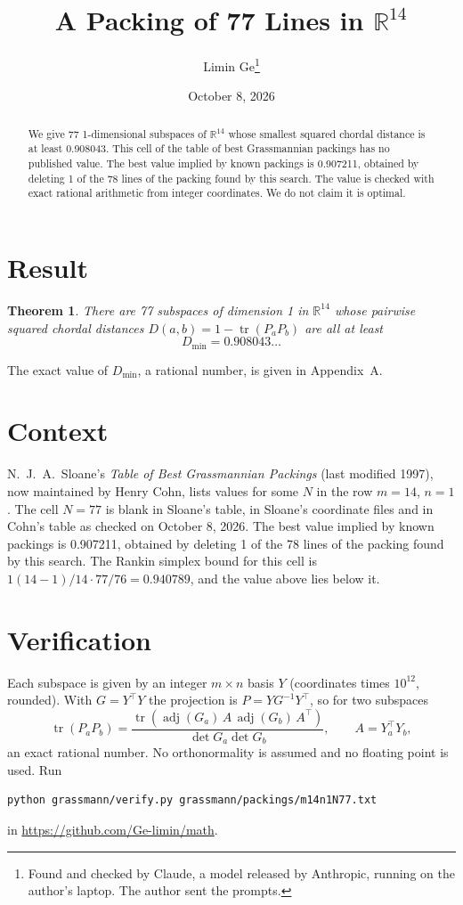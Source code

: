 \documentclass[11pt,a4paper]{article}
\title{A Packing of 77 Lines in $\mathbb{R}^{14}$}
\author{Limin Ge\thanks{Found and checked by Claude, a model released by Anthropic, running on the author's laptop. The author sent the prompts.}}
\date{October 8, 2026}
\newtheorem*{theorem}{Theorem}
\begin{document}
\maketitle
\begin{abstract}
We give 77 1-dimensional subspaces of $\mathbb{R}^{14}$ whose smallest squared chordal distance is at least 0.908043. This cell of the table of best Grassmannian packings has no published value. The best value implied by known packings is 0.907211, obtained by deleting 1 of the 78 lines of the packing found by this search. The value is checked with exact rational arithmetic from integer coordinates. We do not claim it is optimal.
\end{abstract}

\section{Result}
\begin{theorem}
There are 77 subspaces of dimension 1 in $\mathbb{R}^{14}$ whose pairwise squared chordal distances $D(a,b) = 1 - \operatorname{tr}(P_aP_b)$ are all at least
\[ D_{\min} = 0.908043\ldots \]
\end{theorem}
The exact value of $D_{\min}$, a rational number, is given in Appendix~A.


\section{Context}
N.~J.~A.~Sloane's \emph{Table of Best Grassmannian Packings} (last modified 1997), now maintained by Henry Cohn, lists values for some $N$ in the row $m=14$, $n=1$. The cell $N=77$ is blank in Sloane's table, in Sloane's coordinate files and in Cohn's table as checked on October 8, 2026. The best value implied by known packings is 0.907211, obtained by deleting 1 of the 78 lines of the packing found by this search. The Rankin simplex bound for this cell is $1(14-1)/14\cdot 77/76 = 0.940789$, and the value above lies below it.


\section{Verification}
Each subspace is given by an integer $m\times n$ basis $Y$ (coordinates times $10^{12}$, rounded). With $G=Y^\top Y$ the projection is $P=YG^{-1}Y^\top$, so for two subspaces
\[ \operatorname{tr}(P_aP_b)=\frac{\operatorname{tr}(\operatorname{adj}(G_a)\,A\,\operatorname{adj}(G_b)\,A^\top)}{\det G_a\det G_b},\qquad A=Y_a^\top Y_b, \]
an exact rational number. No orthonormality is assumed and no floating point is used. Run
\begin{verbatim}
python grassmann/verify.py grassmann/packings/m14n1N77.txt
\end{verbatim}
in \url{https://github.com/Ge-limin/math}.
\end{document}
